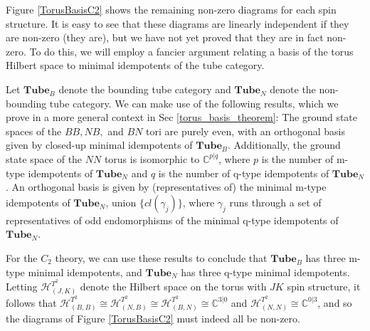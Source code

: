 \documentclass[12pt,a4paper]{article}
\newcommand{\cc}{\mathbb{C}}
\newcommand{\mch}{\mathcal{H}}
\newcommand{\tube}{\textbf{Tube}}
\begin{document}
Figure \ref{TorusBasisC2} shows the remaining non-zero diagrams for each spin structure.
It is easy to see that these diagrams are linearly independent if they are non-zero (they are), but we have not yet proved that they are in fact non-zero.
To do this, we will employ a fancier argument relating a basis of the torus Hilbert space to minimal idempotents of the tube category.

Let $\tube_B$ denote the bounding tube category and $\tube_N$ denote the non-bounding tube category.
We can make use of the following results, which we prove in a more general context in Sec \ref{torus_basis_theorem}:
The ground state spaces of the ${BB}, {NB},$ and ${BN}$ tori are purely even, with an orthogonal basis given by closed-up minimal idempotents of $\tube_B$.
Additionally, the ground state space of the $NN$ torus is isomorphic to $\cc^{p|q}$, where $p$ is the number of m-type idempotents of $\tube_N$
and $q$ is the number of q-type idempotents of $\tube_N$.
An orthogonal basis is given by (representatives of) the minimal m-type idempotents of $\tube_N$,
union $\{cl(\gamma_j)\}$,
where $\gamma_j$ runs through a set of representatives of odd endomorphisms of the minimal q-type idempotents of $\tube_N$.

For the $C_2$ theory, we can use these results to conclude that $\tube_B$ has three m-type minimal idempotents, and $\tube_N$ has three q-type minimal idempotents.
Letting $\mch^{T^2}_{(J,K)}$ denote the Hilbert space on the torus with $JK$ spin structure, it follows that $\mch^{T^2}_{(B,B)} \cong \mch^{T^2}_{(N,B)} \cong \mch^{T^2}_{(B,N)} \cong \cc^{3|0}$ and
$\mch^{T^2}_{(N,N)} \cong \cc^{0|3}$,
and so the diagrams of Figure \ref{TorusBasisC2} must indeed all be non-zero.
\end{document}

